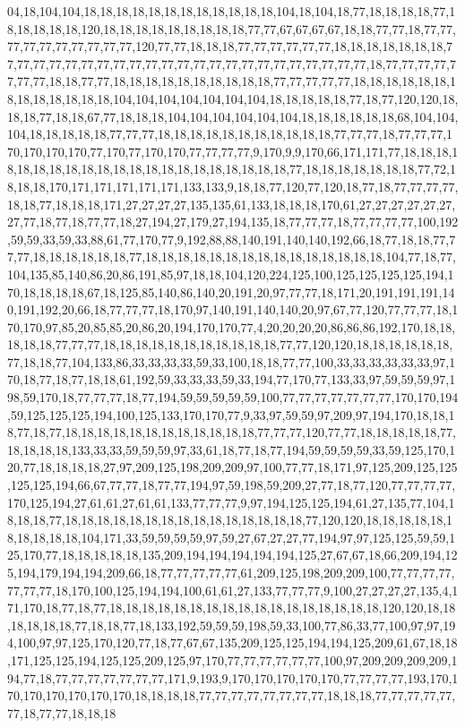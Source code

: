 04,18,104,104,18,18,18,18,18,18,18,18,18,18,18,18,104,18,104,18,77,18,18,18,18,77,18,18,18,18,18,120,18,18,18,18,18,18,18,18,18,77,77,67,67,67,67,18,18,77,77,18,77,77,77,77,77,77,77,77,77,77,120,77,77,18,18,18,77,77,77,77,77,77,18,18,18,18,18,18,18,77,77,77,77,77,77,77,77,77,77,77,77,77,77,77,77,77,77,77,77,77,77,77,18,77,77,77,77,77,77,77,18,18,77,77,18,18,18,18,18,18,18,18,18,18,77,77,77,77,77,18,18,18,18,18,18,18,18,18,18,18,18,18,104,104,104,104,104,104,104,18,18,18,18,18,77,18,77,120,120,18,18,18,77,18,18,67,77,18,18,18,104,104,104,104,104,104,18,18,18,18,18,18,68,104,104,104,18,18,18,18,18,77,77,77,18,18,18,18,18,18,18,18,18,18,18,77,77,77,18,77,77,77,170,170,170,170,77,170,77,170,170,77,77,77,77,9,170,9,9,170,66,171,171,77,18,18,18,18,18,18,18,18,18,18,18,18,18,18,18,18,18,18,18,18,18,77,18,18,18,18,18,18,18,77,72,18,18,18,170,171,171,171,171,171,133,133,9,18,18,77,120,77,120,18,77,18,77,77,77,77,18,18,77,18,18,18,171,27,27,27,27,135,135,61,133,18,18,18,170,61,27,27,27,27,27,27,27,77,18,77,18,77,77,18,27,194,27,179,27,194,135,18,77,77,77,18,77,77,77,77,100,192,59,59,33,59,33,88,61,77,170,77,9,192,88,88,140,191,140,140,192,66,18,77,18,18,77,77,77,18,18,18,18,18,18,77,18,18,18,18,18,18,18,18,18,18,18,18,18,18,18,104,77,18,77,104,135,85,140,86,20,86,191,85,97,18,18,104,120,224,125,100,125,125,125,125,194,170,18,18,18,18,67,18,125,85,140,86,140,20,191,20,97,77,77,18,171,20,191,191,191,140,191,192,20,66,18,77,77,77,18,170,97,140,191,140,140,20,97,67,77,120,77,77,77,18,170,170,97,85,20,85,85,20,86,20,194,170,170,77,4,20,20,20,20,86,86,86,192,170,18,18,18,18,18,77,77,77,18,18,18,18,18,18,18,18,18,18,18,77,77,120,120,18,18,18,18,18,18,77,18,18,77,104,133,86,33,33,33,33,59,33,100,18,18,77,77,100,33,33,33,33,33,33,97,170,18,77,18,77,18,18,61,192,59,33,33,33,59,33,194,77,170,77,133,33,97,59,59,59,97,198,59,170,18,77,77,77,18,77,194,59,59,59,59,59,100,77,77,77,77,77,77,77,170,170,194,59,125,125,125,194,100,125,133,170,170,77,9,33,97,59,59,97,209,97,194,170,18,18,18,77,18,77,18,18,18,18,18,18,18,18,18,18,18,18,77,77,77,120,77,77,18,18,18,18,18,77,18,18,18,18,133,33,33,59,59,59,97,33,61,18,77,18,77,194,59,59,59,59,33,59,125,170,120,77,18,18,18,18,27,97,209,125,198,209,209,97,100,77,77,18,171,97,125,209,125,125,125,125,194,66,67,77,77,18,77,77,194,97,59,198,59,209,27,77,18,77,120,77,77,77,77,170,125,194,27,61,61,27,61,61,133,77,77,77,9,97,194,125,125,194,61,27,135,77,104,18,18,18,77,18,18,18,18,18,18,18,18,18,18,18,18,18,18,18,77,120,120,18,18,18,18,18,18,18,18,18,18,104,171,33,59,59,59,59,97,59,27,67,27,27,77,194,97,97,125,125,59,59,125,170,77,18,18,18,18,18,135,209,194,194,194,194,194,125,27,67,67,18,66,209,194,125,194,179,194,194,209,66,18,77,77,77,77,77,61,209,125,198,209,209,100,77,77,77,77,77,77,77,18,170,100,125,194,194,100,61,61,27,133,77,77,77,9,100,27,27,27,27,135,4,171,170,18,77,18,77,18,18,18,18,18,18,18,18,18,18,18,18,18,18,18,18,18,120,120,18,18,18,18,18,18,77,18,18,77,18,133,192,59,59,59,198,59,33,100,77,86,33,77,100,97,97,194,100,97,97,125,170,120,77,18,77,67,67,135,209,125,125,194,194,125,209,61,67,18,18,171,125,125,194,125,125,209,125,97,170,77,77,77,77,77,77,100,97,209,209,209,209,194,77,18,77,77,77,77,77,77,77,171,9,193,9,170,170,170,170,170,77,77,77,77,193,170,170,170,170,170,170,170,18,18,18,18,77,77,77,77,77,77,77,77,18,18,18,77,77,77,77,77,77,18,77,77,18,18,18